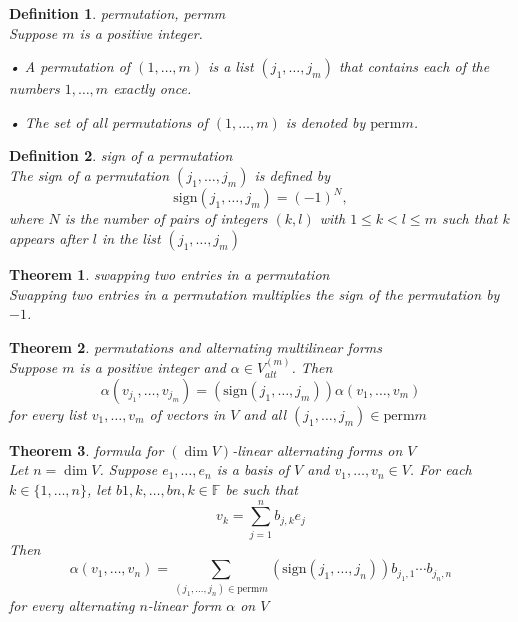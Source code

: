 \documentclass{article}
\newtheorem{theorem}{Theorem}[subsection]
\newtheorem{definition}{Definition}[subsection]
\newcommand{\FF}{\mathbb{F}}
\newcommand{\sign}{\text{sign}}
\newcommand{\perm}{\text{perm}}
\begin{document}
\begin{CJK}{UTF8}{gkai}
\begin{definition}
    permutation, permm\\

    Suppose $m$ is a positive integer.

    • A permutation of $(1,\ldots,m)$ is a list $(j_1,\ldots,j_m)$ that contains each of the numbers $1,\ldots,m$ exactly once.

    • The set of all permutations of $(1,\ldots,m)$ is denoted by $\perm m$.
\end{definition}

\begin{definition}
    sign of a permutation\\
    
    The sign of a permutation $(j_1,\ldots,j_m)$ is defined by
    \[\sign(j_1, \ldots,j_m) = (-1)^N,\]
    where $N$ is the number of pairs of integers $(k,l)$ with $1 \leq k < l \leq m$ such that $k$ appears after $l$ in the list $(j_1,\ldots,j_m)$
\end{definition}

\begin{theorem}
    swapping two entries in a permutation\\

    Swapping two entries in a permutation multiplies the sign of the permutation by $-1$.
\end{theorem}

\begin{theorem}
    permutations and alternating multilinear forms\\

    Suppose $m$ is a positive integer and $\alpha \in V^{(m)}_{alt}$. Then
    \[\alpha(v_{j_1}, \ldots,v_{j_m} ) = (\sign(j_1,\ldots,j_m))\alpha(v_1,\ldots,v_m)\]
    for every list $v_1,\ldots,v_m$ of vectors in $V$ and all $(j_1,\ldots,j_m) \in \perm m$
\end{theorem}

\begin{theorem}
    formula for $(\dim V)$-linear alternating forms on $V$\\

    Let $n = \dim V$. Suppose $e_1,\ldots,e_n$ is a basis of $V$ and $v_1,\ldots,v_n \in V$. For each $k \in \{1,\ldots,n\}$, let $b{1,k},\ldots,b{n,k} \in \FF$ be such that
    \[v_k = \sum_{j = 1}^n b_{j,k}e_j\]
    Then
    \[\alpha(v_1,\ldots,v_n) = \sum_{(j_1,\ldots,j_n)\in \perm m} (\sign(j_1,\ldots,j_n)) b_{j_1,1} \cdots b_{j_n,n}\]
    for every alternating $n$-linear form $\alpha$ on $V$
\end{theorem}


\end{CJK}
\end{document}
